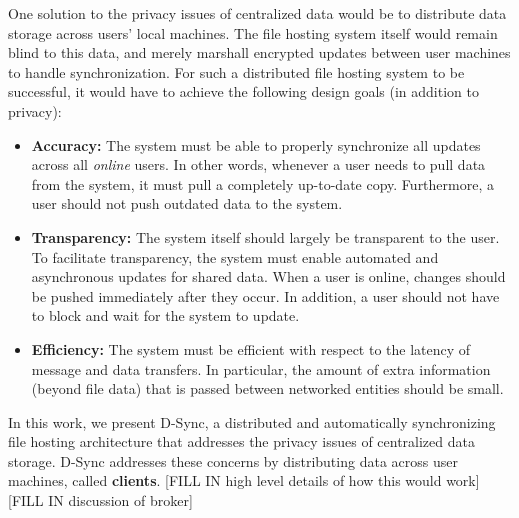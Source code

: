 One solution to the privacy issues of centralized data would be to distribute
data storage across users' local machines.
The file hosting system itself would remain blind to this data, 
and merely marshall encrypted updates between user machines to handle synchronization.
For such a distributed file hosting system to be successful, it would have to achieve
the following design goals (in addition to privacy):
\begin{itemize}
    \item \textbf{Accuracy:} The system must be able to properly synchronize all updates across all \emph{online} users. In other words, whenever a user needs to pull
    data from the system, it must pull a completely up-to-date copy.  Furthermore, a user should not push outdated data to the system.
    \item \textbf{Transparency:} The system itself should largely be transparent to the user. 
    To facilitate transparency, the system must enable automated and asynchronous updates for shared data. When a user is online,
    changes should be pushed immediately after they occur. In addition, a user should not have to block and wait for the system to update.
    \item \textbf{Efficiency:} The system must be efficient with respect to the latency of message and data transfers. 
    In particular, the amount of extra information (beyond file data) 
    that is passed between networked entities should be small.
\end{itemize}

In this work, we present D-Sync, a distributed and automatically synchronizing file hosting
architecture that addresses the privacy issues of centralized data storage.
D-Sync addresses these concerns
by distributing data across user machines, called \textbf{clients}.
[FILL IN high level details of how this would work]
[FILL IN discussion of broker]

